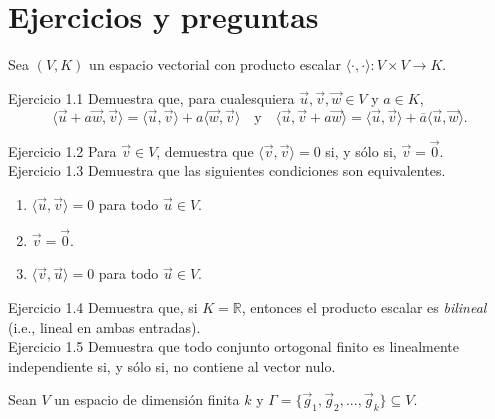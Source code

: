 \documentclass[12pt,dvipsnames]{article}
\numberwithin{equation}{section}
\begin{document}

\section{Ejercicios y preguntas}

\begin{center}
    Sea $(V,K)$ un espacio vectorial con producto escalar $\langle\cdot,\cdot\rangle:V\times V\to K$.
\end{center}

Ejercicio 1.1 Demuestra que,  para cualesquiera $\vec{u},\vec{v},\vec{w}\in V$ y $a\in K$,
\[
    \langle \vec{u} + a\vec{w}, \vec{v}\rangle = \langle \vec{u},\vec{v}\rangle + a\langle \vec{w}, \vec{v}\rangle \quad \text{y} \quad \langle \vec{u}, \vec{v} + a\vec{w}\rangle = \langle \vec{u},\vec{v}\rangle + \overline{a}\langle \vec{u}, \vec{w}\rangle.
\] 

Ejercicio 1.2 Para $\vec{v}\in V$, demuestra que $\langle \vec{v} , \vec{v} \rangle = 0$ si, y sólo si, $\vec{v}=\vec{0}$. \\

Ejercicio 1.3 Demuestra que las siguientes condiciones son equivalentes. %

\begin{enumerate}[label=(\alph*)]
    \item $\langle \vec{u} , \vec{v} \rangle = 0$ para todo $\vec{u}\in V$.

    \item $\vec{v}=\vec{0}$.

    \item $\langle \vec{v} , \vec{u} \rangle = 0$ para todo $\vec{u}\in V$.
\end{enumerate}

Ejercicio 1.4 Demuestra que, si $K=\mathbb{R}$, entonces el producto escalar es \emph{bilineal} (i.e., lineal en ambas entradas). \\

Ejercicio 1.5 Demuestra que todo conjunto ortogonal finito es linealmente independiente si, y sólo si, no contiene al vector nulo. \\

\begin{center}
Sean $V$ un espacio de dimensión finita $k$ y $\Gamma=\{\vec{g}_1,\vec{g}_2,...,\vec{g}_k\}\subseteq V$.
\end{center}
\end{document}
